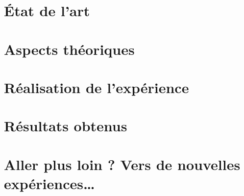 \documentclass[a4paper,11pt]{report}
\begin{document}
\chapter{État de l'art}

\chapter{Aspects théoriques}


\chapter{Réalisation de l'expérience}

    
\chapter{Résultats obtenus}


\chapter{Aller plus loin ? Vers de nouvelles expériences…}




\end{document}
